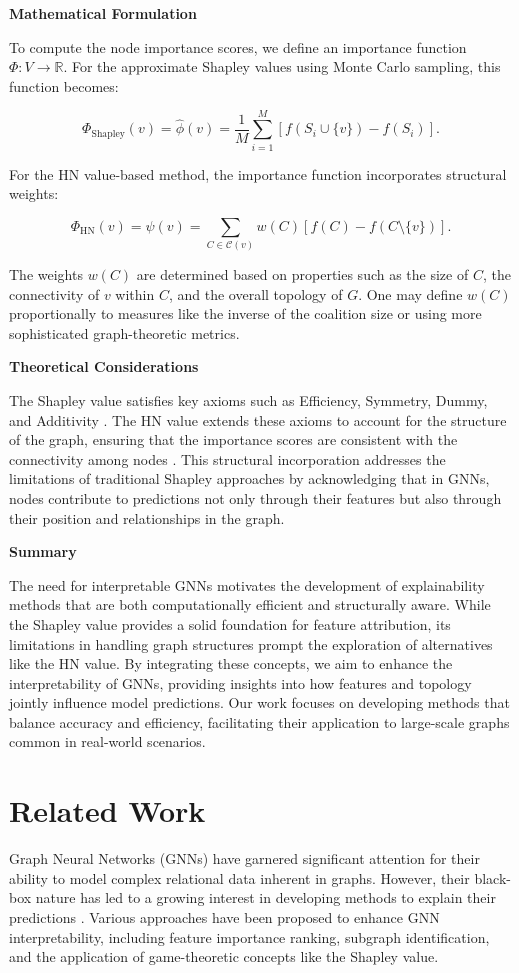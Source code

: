 \documentclass{article}
\begin{document}
\textbf{Mathematical Formulation}

To compute the node importance scores, we define an importance function $\Phi: V \rightarrow \mathbb{R}$. For the approximate Shapley values using Monte Carlo sampling, this function becomes:

\[
\Phi_{\text{Shapley}}(v) = \hat{\phi}(v) = \frac{1}{M} \sum_{i=1}^{M} \left[ f(S_i \cup \{v\}) - f(S_i) \right].
\]

For the HN value-based method, the importance function incorporates structural weights:

\[
\Phi_{\text{HN}}(v) = \psi(v) = \sum_{C \in \mathcal{C}(v)} w(C) \left[ f(C) - f(C \setminus \{v\}) \right].
\]

The weights $w(C)$ are determined based on properties such as the size of $C$, the connectivity of $v$ within $C$, and the overall topology of $G$. One may define $w(C)$ proportionally to measures like the inverse of the coalition size or using more sophisticated graph-theoretic metrics.

\textbf{Theoretical Considerations}

The Shapley value satisfies key axioms such as Efficiency, Symmetry, Dummy, and Additivity \cite{arXiv:2008.05052v1}. The HN value extends these axioms to account for the structure of the graph, ensuring that the importance scores are consistent with the connectivity among nodes \cite{arXiv:2201.12380v5}. This structural incorporation addresses the limitations of traditional Shapley approaches by acknowledging that in GNNs, nodes contribute to predictions not only through their features but also through their position and relationships in the graph.

\textbf{Summary}

The need for interpretable GNNs motivates the development of explainability methods that are both computationally efficient and structurally aware. While the Shapley value provides a solid foundation for feature attribution, its limitations in handling graph structures prompt the exploration of alternatives like the HN value. By integrating these concepts, we aim to enhance the interpretability of GNNs, providing insights into how features and topology jointly influence model predictions. Our work focuses on developing methods that balance accuracy and efficiency, facilitating their application to large-scale graphs common in real-world scenarios.

\section{Related Work}
Graph Neural Networks (GNNs) have garnered significant attention for their ability to model complex relational data inherent in graphs. However, their black-box nature has led to a growing interest in developing methods to explain their predictions \cite{arXiv:2203.09258v1}. Various approaches have been proposed to enhance GNN interpretability, including feature importance ranking, subgraph identification, and the application of game-theoretic concepts like the Shapley value.
\end{document}
